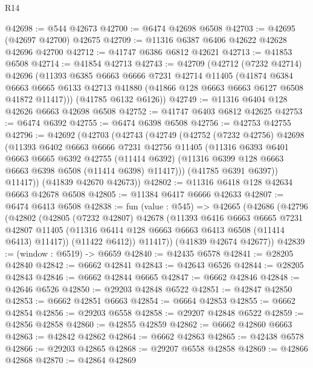 \begin{lexlean}{R14}
\begin{coremodule}
@42698 := @544 @42673
@42700 := @6474 @42698 @6508
@42703 := @42695 (@42697 @42700) @42675
@42709 := @11316 @6387 @6406 @42622 @42628 @42696 @42700
@42712 := @41747 @6386 @6812 @42621
@42713 := @41853 @6508
@42714 := @41854 @42713
@42743 := @42709
    (@42712
      (@7232 @42714)
      @42696
      (@11393
        @6385
        @6663
        @6666
        @7231
        @42714
        @11405
        (@41874
          @6384
          @6663
          @6665
          @6133
          @42713
          @41880
          (@41866 @128 @6663 @6663 @6127 @6508 @41872 @11417)))
      (@41785 @6132 @6126))
@42749 := @11316 @6404 @128 @42626 @6663 @42698 @6508
@42752 := @41747 @6403 @6812 @42625
@42753 := @6474 @6392
@42755 := @6474 @6398 @6508
@42756 := @42753 @42755
@42796 := @42692
    (@42703
      (@42743
        (@42749
          (@42752
            (@7232 @42756)
            @42698
            (@11393
              @6402
              @6663
              @6666
              @7231
              @42756
              @11405
              (@11316
                @6393
                @6401
                @6663
                @6665
                @6392
                @42755
                (@11414 @6392)
                (@11316 @6399 @128 @6663 @6663 @6398 @6508 (@11414 @6398) @11417)))
            (@41785 @6391 @6397))
          @11417))
      (@41839 @42670 @42673))
@42802 := @11316 @6418 @128 @42634 @6663 @42678 @6508
@42805 := @11384 @6417 @6666 @42633
@42807 := @6474 @6413 @6508
@42838 := fun (value : @545) =>
  @42665
    (@42686
      (@42796
        (@42802
          (@42805
            (@7232 @42807)
            @42678
            (@11393
              @6416
              @6663
              @6665
              @7231
              @42807
              @11405
              (@11316 @6414 @128 @6663 @6663 @6413 @6508 (@11414 @6413) @11417))
            (@11422 @6412))
          @11417))
      (@41839 @42674 @42677))
@42839 := (window : @6519) -> @6659
@42840 := @42435 @6578
@42841 := @28205 @42840
@42842 := @6662 @42841
@42843 := @42643 @6526
@42844 := @28205 @42843
@42846 := @6662 @42844 @6665
@42847 := @6662 @42846
@42848 := @42646 @6526
@42850 := @29203 @42848 @6522
@42851 := @42847 @42850
@42853 := @6662 @42851 @6663
@42854 := @6664 @42853
@42855 := @6662 @42854
@42856 := @29203 @6558
@42858 := @29207 @42848 @6522
@42859 := @42856 @42858
@42860 := @42855 @42859
@42862 := @6662 @42860 @6663
@42863 := @42842 @42862
@42864 := @6662 @42863
@42865 := @42438 @6578
@42866 := @29203 @42865
@42868 := @29207 @6558 @42858
@42869 := @42866 @42868
@42870 := @42864 @42869

\end{coremodule}
\end{lexlean}
